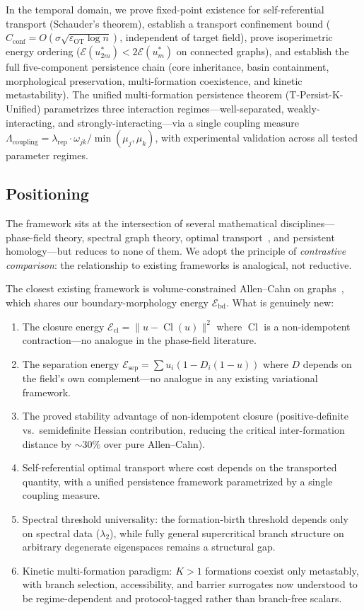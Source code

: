 \documentclass[lettersize,journal]{IEEEtran}
\DeclareMathOperator{\Cl}{Cl}
\begin{document}
In the temporal domain, we prove fixed-point existence for self-referential transport (Schauder's theorem), establish a transport confinement bound ($C_{\mathrm{conf}} = O(\sigma\sqrt{\varepsilon_{\mathrm{OT}}\log n})$, independent of target field), prove isoperimetric energy ordering ($\mathcal{E}(u^*_{2m}) < 2\mathcal{E}(u^*_m)$ on connected graphs), and establish the full five-component persistence chain (core inheritance, basin containment, morphological preservation, multi-formation coexistence, and kinetic metastability). The unified multi-formation persistence theorem (T-Persist-K-Unified) parametrizes three interaction regimes---well-separated, weakly-interacting, and strongly-interacting---via a single coupling measure $\Lambda_{\mathrm{coupling}} = \lambda_{\mathrm{rep}} \cdot \omega_{jk} / \min(\mu_j, \mu_k)$, with experimental validation across all tested parameter regimes.

\subsection{Positioning}

The framework sits at the intersection of several mathematical disciplines---phase-field theory, spectral graph theory, optimal transport~\cite{Peyre2019}, and persistent homology---but reduces to none of them. We adopt the principle of \emph{contrastive comparison}: the relationship to existing frameworks is analogical, not reductive.

The closest existing framework is volume-constrained Allen--Cahn on graphs~\cite{vanGennip2012}, which shares our boundary-morphology energy $\mathcal{E}_{\mathrm{bd}}$. What is genuinely new:

\begin{enumerate}
\item The closure energy $\mathcal{E}_{\mathrm{cl}} = \|u - \Cl(u)\|^2$ where $\Cl$ is a non-idempotent contraction---no analogue in the phase-field literature.
\item The separation energy $\mathcal{E}_{\mathrm{sep}} = \sum u_i(1 - D_i(1-u))$ where $D$ depends on the field's own complement---no analogue in any existing variational framework.
\item The proved stability advantage of non-idempotent closure (positive-definite vs.\ semidefinite Hessian contribution, reducing the critical inter-formation distance by ${\sim}30\%$ over pure Allen--Cahn).
\item Self-referential optimal transport where cost depends on the transported quantity, with a unified persistence framework parametrized by a single coupling measure.
\item Spectral threshold universality: the formation-birth threshold depends only on spectral data ($\lambda_2$), while fully general supercritical branch structure on arbitrary degenerate eigenspaces remains a structural gap.
\item Kinetic multi-formation paradigm: $K > 1$ formations coexist only metastably, with branch selection, accessibility, and barrier surrogates now understood to be regime-dependent and protocol-tagged rather than branch-free scalars.
\end{enumerate}
\end{document}

